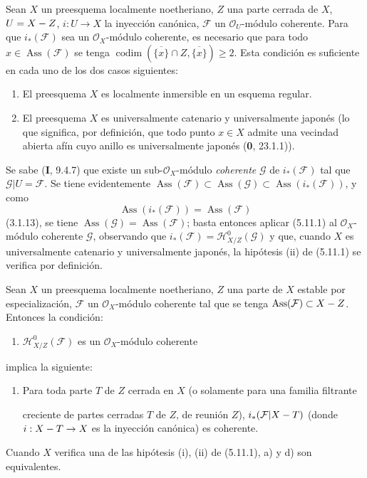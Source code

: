\begin{corollary}[5.11.4]
Sean $X$ un preesquema localmente noetheriano, $Z$ una parte cerrada de $X$,
$U=X- Z$, $i:U\to X$ la inyección canónica, $\mathcal F$ un
$\mathcal O_U$-módulo coherente. Para que $i_*(\mathcal F)$ sea un
$\mathcal O_X$-módulo coherente, es necesario que para todo
$x\in\operatorname{Ass}(\mathcal F)$ se tenga
$\operatorname{codim}(\overline{\{x\}}\cap Z,\overline{\{x\}})\geq2$.
Esta condición es suficiente en cada uno de los dos casos siguientes:
\begin{enumerate}
\item[\textup{(i)}] El preesquema $X$ es localmente inmersible en un esquema regular.
\item[\textup{(ii)}] El preesquema $X$ es universalmente catenario y universalmente
japonés \textup{(lo que significa, por definición, que todo punto $x\in X$ admite una
vecindad abierta afín cuyo anillo es} universalmente japonés \textup{(\textbf{0},
23.1.1))}.
\end{enumerate}
\end{corollary}

Se sabe (\textbf I, 9.4.7) que existe un sub-$\mathcal O_X$-módulo \emph{coherente}
$\mathcal G$ de $i_*(\mathcal F)$ tal que $\mathcal G\vert U=\mathcal F$. Se
tiene evidentemente
$\operatorname{Ass}(\mathcal F)\subset\operatorname{Ass}(\mathcal G)
\subset\operatorname{Ass}(i_*(\mathcal F))$, y como
\[
\operatorname{Ass}(i_*(\mathcal F))=\operatorname{Ass}(\mathcal F)
\]
(3.1.13), se tiene $\operatorname{Ass}(\mathcal G)=\operatorname{Ass}(\mathcal F)$;
basta entonces aplicar (5.11.1) al $\mathcal O_X$-módulo coherente
$\mathcal G$, observando que $i_*(\mathcal F)=\mathcal H^0_{X/Z}(\mathcal G)$
y que, cuando $X$ es universalmente catenario y universalmente japonés,
la hipótesis (ii) de (5.11.1) se verifica por definición.

\begin{corollary}[5.11.5]
\label{IV.2.s5.11.5-fr}
Sean $X$ un preesquema localmente noetheriano, $Z$ una parte de $X$ estable por
especialización, $\mathcal F$ un $\mathcal O_X$-módulo coherente tal que se
tenga $\operatorname{Ass}(\mathcal F)\subset X- Z$. Entonces la condición:
\begin{enumerate}
\item[\textup{a)}] $\mathcal H^0_{X/Z}(\mathcal F)$ es un $\mathcal O_X$-módulo
coherente
\end{enumerate}
implica la siguiente:
\begin{enumerate}
\item[\textup{d)}] Para toda parte $T$ de $Z$ cerrada en $X$ \textup{(o solamente para una}
familia filtrante


creciente \textup{de partes cerradas $T$ de $Z$, de reunión $Z$)},
$i_*(\mathcal F\vert X- T)$ (donde $i:X- T\to X$ es la inyección canónica) es
coherente.
\end{enumerate}
Cuando $X$ verifica una de las hipótesis \textup{(i), (ii)} de \textup{(5.11.1), a)} y \textup{d)} son
equivalentes.
\end{corollary}

